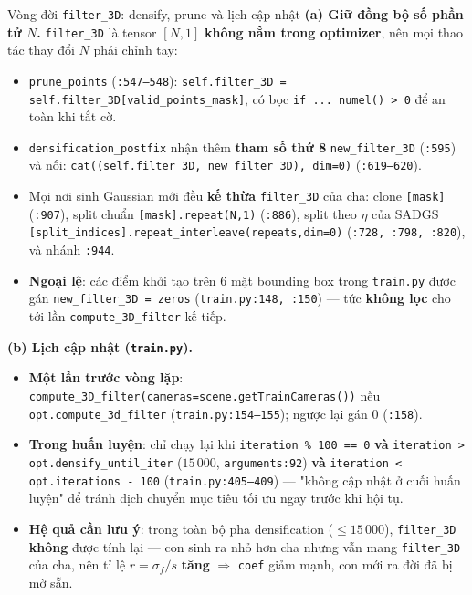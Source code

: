 \begin{frame}{Vòng đời \texttt{filter\_3D}: densify, prune và lịch cập nhật}
\footnotesize
\textbf{(a) Giữ đồng bộ số phần tử $N$.} \texttt{filter\_3D} là tensor $[N,1]$ \textbf{không nằm trong optimizer}, nên mọi thao tác thay đổi $N$ phải chỉnh tay:
\begin{itemize}
    \item \texttt{prune\_points} (\texttt{:547--548}): \texttt{self.filter\_3D = self.filter\_3D[valid\_points\_mask]}, có bọc \texttt{if ... numel() > 0} để an toàn khi tắt cờ.
    \item \texttt{densification\_postfix} nhận thêm \textbf{tham số thứ 8} \texttt{new\_filter\_3D} (\texttt{:595}) và nối: \texttt{cat((self.filter\_3D, new\_filter\_3D), dim=0)} (\texttt{:619--620}).
    \item Mọi nơi sinh Gaussian mới đều \textbf{kế thừa} \texttt{filter\_3D} của cha: clone \texttt{[mask]} (\texttt{:907}), split chuẩn \texttt{[mask].repeat(N,1)} (\texttt{:886}), split theo $\eta$ của SADGS \texttt{[split\_indices].repeat\_interleave(repeats,dim=0)} (\texttt{:728, :798, :820}), và nhánh \texttt{:944}.
    \item \textbf{Ngoại lệ}: các điểm khởi tạo trên 6 mặt bounding box trong \texttt{train.py} được gán \texttt{new\_filter\_3D = zeros} (\texttt{train.py:148, :150}) --- tức \textbf{không lọc} cho tới lần \texttt{compute\_3D\_filter} kế tiếp.
\end{itemize}
\textbf{(b) Lịch cập nhật (\texttt{train.py}).}
\begin{itemize}
    \item \textbf{Một lần trước vòng lặp}: \texttt{compute\_3D\_filter(cameras=scene.getTrainCameras())} nếu \texttt{opt.compute\_3d\_filter} (\texttt{train.py:154--155}); ngược lại gán 0 (\texttt{:158}).
    \item \textbf{Trong huấn luyện}: chỉ chạy lại khi \texttt{iteration \% 100 == 0} \textbf{và} \texttt{iteration > opt.densify\_until\_iter} ($15\,000$, \texttt{arguments:92}) \textbf{và} \texttt{iteration < opt.iterations - 100} (\texttt{train.py:405--409}) --- "không cập nhật ở cuối huấn luyện" để tránh dịch chuyển mục tiêu tối ưu ngay trước khi hội tụ.
    \item \textbf{Hệ quả cần lưu ý}: trong toàn bộ pha densification ($\le 15\,000$), \texttt{filter\_3D} \textbf{không} được tính lại --- con sinh ra nhỏ hơn cha nhưng vẫn mang \texttt{filter\_3D} của cha, nên tỉ lệ $r=\sigma_f/s$ \textbf{tăng} $\Rightarrow$ \texttt{coef} giảm mạnh, con mới ra đời đã bị mờ sẵn.
\end{itemize}
\end{frame}


